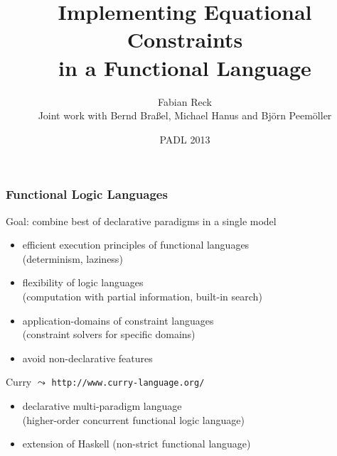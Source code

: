 \documentclass[10pt]{beamer}
\date{PADL 2013}
\author[Fabian Reck]{Fabian Reck\\[2ex]
{\small Joint work with Bernd Bra\ss{}el, Michael Hanus and Bj\"orn Peem\"oller}}
\institute[CAU Kiel]{Christian-Albrechts-University of Kiel\\
  Programming Languages and Compiler Construction}
\begin{document}

\title[Implementing Equational Constraints in a Functional Language]
      {Implementing Equational Constraints\\
       in a Functional Language}
\frame{\titlepage}


\begin{frame}[fragile]
\frametitle{Functional Logic Languages}

\begin{block}{Goal: combine best of declarative paradigms in a single model}
\begin{itemize}%
\item {\blue efficient execution} principles of functional languages\\
(determinism, laziness)
\item {\blue flexibility} of logic languages\\
(computation with partial information, built-in search)
\item {\blue application-domains} of constraint languages\\
(constraint solvers for specific domains)
\item avoid non-declarative features
\end{itemize}
\end{block}
\vfill
\pause

\begin{block}{Curry {} $\leadsto$ {\tt http://www.curry-language.org/}}
\begin{itemize}%
\item declarative multi-paradigm language\\
 (higher-order concurrent functional logic language)
\item extension of Haskell (non-strict functional language)
\end{itemize}
\end{block}
\end{frame}
\end{document}
